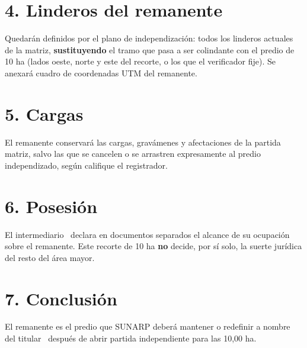 \documentclass[12pt,a4paper]{article}
\begin{document}
\section*{4. Linderos del remanente}
Quedarán definidos por el plano de independización: todos los linderos actuales de la matriz, \textbf{sustituyendo} el tramo que pasa a ser colindante con el predio de 10 ha (lados oeste, norte y este del recorte, o los que el verificador fije). Se anexará cuadro de coordenadas UTM del remanente.

\section*{5. Cargas}
El remanente conservará las cargas, gravámenes y afectaciones de la partida matriz, salvo las que se cancelen o se arrastren expresamente al predio independizado, según califique el registrador.

\section*{6. Posesión}
El intermediario \IntermediarioNombre\ declara en documentos separados el alcance de su ocupación sobre el remanente. Este recorte de 10 ha \textbf{no} decide, por sí solo, la suerte jurídica del resto del área mayor.

\section*{7. Conclusión}
El remanente es el predio que SUNARP deberá mantener o redefinir a nombre del titular \VendedorNombreCompleto\ después de abrir partida independiente para las 10,00 ha.

\LugarFecha
\noindent
{}
\hfill
{}
\end{document}
